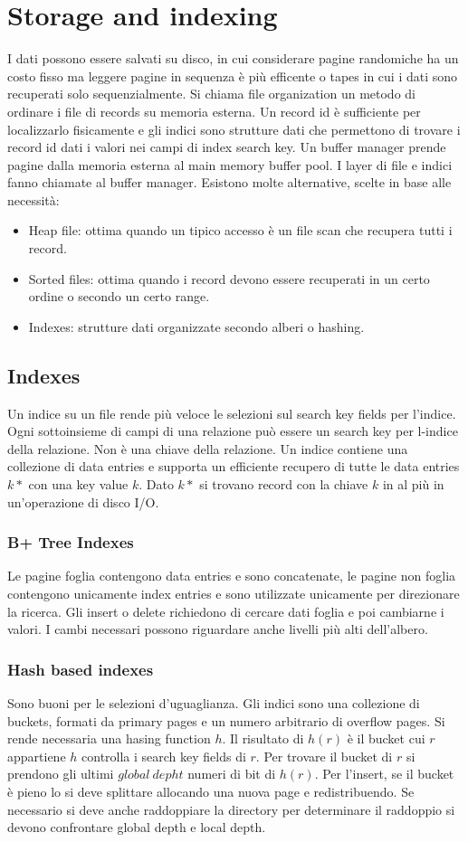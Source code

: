\chapter{Storage and indexing}
I dati possono essere salvati su disco, in cui considerare pagine randomiche ha un costo fisso ma leggere pagine in sequenza \`e pi\`u efficente o tapes
in cui i dati sono recuperati solo sequenzialmente. Si chiama file organization un metodo di ordinare i file di records su memoria esterna. Un record id
\`e sufficiente per localizzarlo fisicamente e gli indici sono strutture dati che permettono di trovare i record id dati i valori nei campi di index search
key. Un buffer manager prende pagine dalla memoria esterna al main memory buffer pool. I layer di file e indici fanno chiamate al buffer manager. Esistono 
molte alternative, scelte in base alle necessit\`a:
\begin{itemize}
\item Heap file: ottima quando un tipico accesso \`e un file scan che recupera tutti i record.
\item Sorted files: ottima quando i record devono essere recuperati in un certo ordine o secondo un certo range. 
\item Indexes: strutture dati organizzate secondo alberi o hashing. 
\end{itemize}
\section{Indexes}
Un indice su un file rende pi\`u veloce le selezioni sul search key fields per l'indice. Ogni sottoinsieme di campi di una relazione pu\`o essere un search
key per l-indice della relazione. Non \`e una chiave della relazione. Un indice contiene una collezione di data entries e supporta un efficiente recupero di
tutte le data entries $k*$ con una key value $k$. Dato $k*$ si trovano record con la chiave $k$ in al pi\`u in un'operazione di disco I/O. 
\subsection{B+ Tree Indexes}
Le pagine foglia contengono data entries e sono concatenate, le pagine non foglia contengono unicamente index entries e sono utilizzate unicamente per 
direzionare la ricerca. Gli insert o delete richiedono di cercare dati foglia e poi cambiarne i valori. I cambi necessari possono riguardare anche
livelli pi\`u alti dell'albero. 
\subsection{Hash based indexes}
Sono buoni per le selezioni d'uguaglianza. Gli indici sono una collezione di buckets, formati da primary pages e un numero arbitrario di overflow pages. Si rende 
necessaria una hasing function $h$. Il risultato di $h(r)$ \`e il bucket cui $r$ appartiene $h$ controlla i search key fields di $r$. Per trovare il bucket di $r$ si 
prendono gli ultimi $global\ depht$ numeri di bit di $h(r)$. Per l'insert, se il bucket \`e pieno lo si deve splittare allocando una nuova page e 
redistribuendo. Se necessario si deve anche raddoppiare la directory per determinare il raddoppio si devono confrontare global depth e local depth. 
